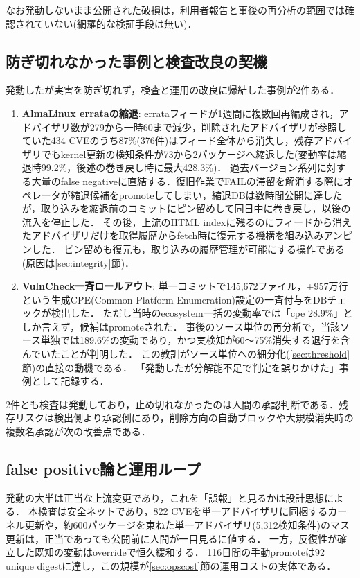 \documentclass{css}
\begin{document}
なお発動しないまま公開された破損は，利用者報告と事後の再分析の範囲では確認されていない(網羅的な検証手段は無い)．

\subsection{防ぎ切れなかった事例と検査改良の契機}
\label{sec:missed}

発動したが実害を防ぎ切れず，検査と運用の改良に帰結した事例が2件ある．

\begin{enumerate}
\item \textbf{AlmaLinux errataの縮退}:
errataフィードが1週間に複数回再編成され，アドバイザリ数が279から一時60まで減少，削除されたアドバイザリが参照していた434 CVEのうち87\%(376件)はフィード全体から消失し，残存アドバイザリでもkernel更新の検知条件が73から2パッケージへ縮退した(変動率は縮退時99.2\%，後述の巻き戻し時に最大428.3\%)．
過去バージョン系列に対する大量のfalse negativeに直結する．復旧作業でFAILの滞留を解消する際にオペレータが縮退候補をpromoteしてしまい，縮退DBは数時間公開に達したが，取り込みを縮退前のコミットにピン留めして同日中に巻き戻し，以後の流入を停止した．
その後，上流のHTML indexに残るのにフィードから消えたアドバイザリだけを取得履歴からfetch時に復元する機構を組み込みアンピンした．
ピン留めも復元も，取り込みの履歴管理が可能にする操作である(原因は\ref{sec:integrity}節)．
\item \textbf{VulnCheck一斉ロールアウト}:
単一コミットで145,672ファイル，+957万行という生成CPE(Common Platform Enumeration)設定の一斉付与をDBチェックが検出した．
ただし当時のecosystem一括の変動率では「cpe 28.9\%」としか言えず，候補はpromoteされた．
事後のソース単位の再分析で，当該ソース単独では189.6\%の変動であり，かつ実検知が60〜75\%消失する退行を含んでいたことが判明した．
この教訓がソース単位への細分化(\ref{sec:threshold}節)の直接の動機である．
「発動したが分解能不足で判定を誤りかけた」事例として記録する．
\end{enumerate}

2件とも検査は発動しており，止め切れなかったのは人間の承認判断である．残存リスクは検出側より承認側にあり，削除方向の自動ブロックや大規模消失時の複数名承認が次の改善点である．

\subsection{false positive論と運用ループ}
\label{sec:fp}

発動の大半は正当な上流変更であり，これを「誤報」と見るかは設計思想による．
本検査は安全ネットであり，822 CVEを単一アドバイザリに同梱するカーネル更新や，約600パッケージを束ねた単一アドバイザリ(5,312検知条件)のマス更新は，正当であっても公開前に人間が一目見るに値する．
一方，反復性が確立した既知の変動はoverrideで恒久緩和する．
116日間の手動promoteは92 unique digestに達し，この規模が\ref{sec:opscost}節の運用コストの実体である．
\end{document}
